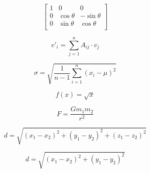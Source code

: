 \documentclass[12pt]{article}
\begin{document}
$$
\begin{bmatrix}
1 & 0 & 0 \\
0 & \cos \theta & -\sin \theta \\
0 & \sin \theta  & \cos \theta \\
\end{bmatrix}
$$

$$
v'_i = \sum_{j = 1}^n A_{ij}\cdot v_j
$$

$$
\sigma = \sqrt{\frac{1}{n - 1}\sum_{i = 1}^n (x_i - \mu)^2}
$$

$$
f(x) = \sqrt{x}
$$

$$
F = \frac{Gm_1m_2}{r^2}
$$

$$
d = \sqrt{(x_1 - x_2)^2 + (y_1 - y_2)^2 + (z_1 -  z_2)^2}
$$

$$
d = \sqrt{(x_1 - x_2)^2+(y_1 - y_2)^2}
$$
\end{document}

